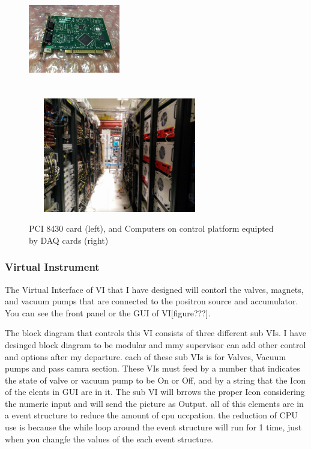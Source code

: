 \documentclass[12pt,a4paper]{article}
\begin{document}
\begin{figure}[h]
\centering
\includegraphics[width=40mm, height=50mm]{PCI_8430}
\includegraphics[width=80mm, height=50mm]{control_platform}
\caption{PCI 8430 card (left), and Computers on control platform equipted by DAQ cards (right) }
\end{figure}
	
\subsubsection{Virtual Instrument}

The Virtual Interface of VI that I have designed will contorl the valves, magnets, and vacuum pumps that are connected to the positron source and accumulator. You can see the front panel or the GUI of VI[figure???]. 

The block diagram that controls this VI consists of three different sub VIs. I have desinged  block diagram to be modular and mmy supervisor can add other control and options after my departure. each of these sub VIs is for Valves, Vacuum pumps and pass camra section. These VIs must feed by a number that indicates the state of valve or vacuum pump to be On or Off, and by a string that the Icon of the elents in GUI are in it. The sub VI will brrows the proper Icon considering the numeric input and will send the picture as Output. all of this elements are in a event structure to reduce the amount of cpu uccpation. the reduction of CPU use is because the while loop around the event structure will run for 1 time, just when you changfe the values of the each event structure.
\end{document}
